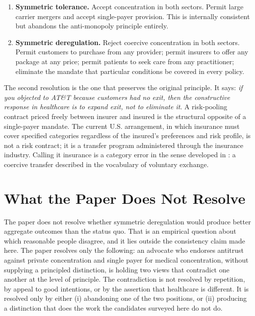 \documentclass[11pt]{article}
\begin{document}
\begin{enumerate}[leftmargin=*]
  \item \textbf{Symmetric tolerance.} Accept concentration in both sectors. Permit large carrier mergers and accept single-payer provision. This is internally consistent but abandons the anti-monopoly principle entirely.
  \item \textbf{Symmetric deregulation.} Reject coercive concentration in both sectors. Permit customers to purchase from any provider; permit insurers to offer any package at any price; permit patients to seek care from any practitioner; eliminate the mandate that particular conditions be covered in every policy.
\end{enumerate}

The second resolution is the one that preserves the original principle. It says: \emph{if you objected to AT\&T because customers had no exit, then the constructive response in healthcare is to expand exit, not to eliminate it}. A risk-pooling contract priced freely between insurer and insured is the structural opposite of a single-payer mandate. The current U.S. arrangement, in which insurance must cover specified categories regardless of the insured's preferences and risk profile, is not a risk contract; it is a transfer program administered through the insurance industry. Calling it insurance is a category error in the sense developed in \cite{mckinley5}: a coercive transfer described in the vocabulary of voluntary exchange.

\section{What the Paper Does Not Resolve}

The paper does not resolve whether symmetric deregulation would produce better aggregate outcomes than the status quo. That is an empirical question about which reasonable people disagree, and it lies outside the consistency claim made here. The paper resolves only the following: an advocate who endorses antitrust against private concentration and single payer for medical concentration, without supplying a principled distinction, is holding two views that contradict one another at the level of principle. The contradiction is not resolved by repetition, by appeal to good intentions, or by the assertion that healthcare is different. It is resolved only by either (i) abandoning one of the two positions, or (ii) producing a distinction that does the work the candidates surveyed here do not do.
\end{document}
